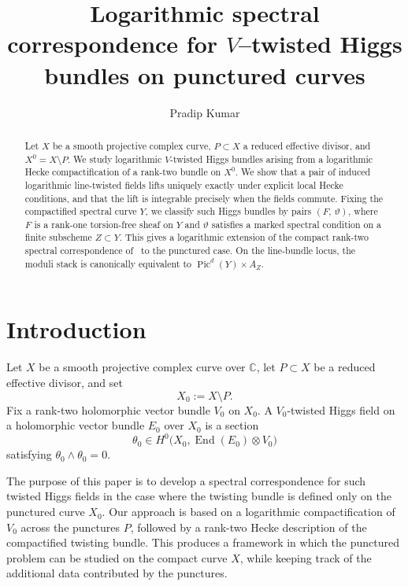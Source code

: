 \documentclass[a4paper,12pt]{amsart}
\title[Logarithmic Spectral Correspondence]{Logarithmic spectral correspondence for $V$--twisted Higgs bundles on punctured curves}
\author{Pradip Kumar}
\numberwithin{equation}{section}
\theoremstyle{definition}
\newcommand{\End}{\operatorname{End}}
\begin{document}
\begin{abstract}
Let \(X\) be a smooth projective complex curve, \(P\subset X\) a reduced effective divisor, and \(X^{0}=X\setminus P\). We study logarithmic \(V\)-twisted Higgs bundles arising from a logarithmic Hecke compactification of a rank-two bundle on \(X^{0}\). We show that a pair of induced logarithmic line-twisted fields lifts uniquely exactly under explicit local Hecke conditions, and that the lift is integrable precisely when the fields commute. Fixing the compactified spectral curve \(Y\), we classify such Higgs bundles by pairs \((F,\,\vartheta)\), where \(F\) is a rank-one torsion-free sheaf on \(Y\) and \(\vartheta\) satisfies a marked spectral condition on a finite subscheme \(Z\subset Y\). This gives a logarithmic extension of the compact rank-two spectral correspondence of~\cite{ABK} to the punctured case. On the line-bundle locus, the moduli stack is canonically equivalent to
\(
\operatorname{Pic}^{d}(Y)\times A_Z .
\)
\end{abstract}

\maketitle
\tableofcontents
\section{Introduction}\label{sec:intro}

Let \(X\) be a smooth projective complex curve over \(\mathbb C\), let \(P\subset X\) be a reduced effective divisor, and set
\[
X_0:=X\setminus P.
\]
Fix a rank-two holomorphic vector bundle \(V_0\) on \(X_0\). A \(V_0\)-twisted Higgs field on a holomorphic vector bundle \(E_0\) over \(X_0\) is a section
\[
\theta_0\in H^0\bigl(X_0,\End(E_0)\otimes V_0\bigr)
\]
satisfying
\(
\theta_0\wedge \theta_0=0.
\)

The purpose of this paper is to develop a spectral correspondence for such twisted Higgs fields in the case where the twisting bundle is defined only on the punctured curve \(X_0\). Our approach is based on a logarithmic compactification of \(V_0\) across the punctures \(P\), followed by a rank-two Hecke description of the compactified twisting bundle. This produces a framework in which the punctured problem can be studied on the compact curve \(X\), while keeping track of the additional data contributed by the punctures.
\end{document}
